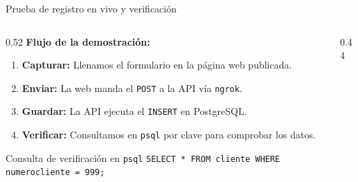 \documentclass[aspectratio=169,11pt]{beamer}
\begin{document}
\begin{frame}{Prueba de registro en vivo y verificación}
  \begin{columns}[T,totalwidth=\textwidth]
    \begin{column}{0.52\textwidth}
      \textbf{\color{AzulClaro} Flujo de la demostración:}
      \vspace{0.2cm}
      \begin{enumerate}
        \item \textbf{Capturar:} Llenamos el formulario en la página web publicada.
        \item \textbf{Enviar:} La web manda el \texttt{POST} a la API vía \texttt{ngrok}.
        \item \textbf{Guardar:} La API ejecuta el \texttt{INSERT} en PostgreSQL.
        \item \textbf{Verificar:} Consultamos en \texttt{psql} por clave para comprobar los datos.
      \end{enumerate}

      \vspace{0.1cm}
      \begin{exampleblock}{Consulta de verificación en \texttt{psql}}
        \scriptsize\texttt{SELECT * FROM cliente WHERE numerocliente = 999;}
      \end{exampleblock}
    \end{column}

    \begin{column}{0.44\textwidth}
    \end{column}
  \end{columns}
\end{frame}
\end{document}
